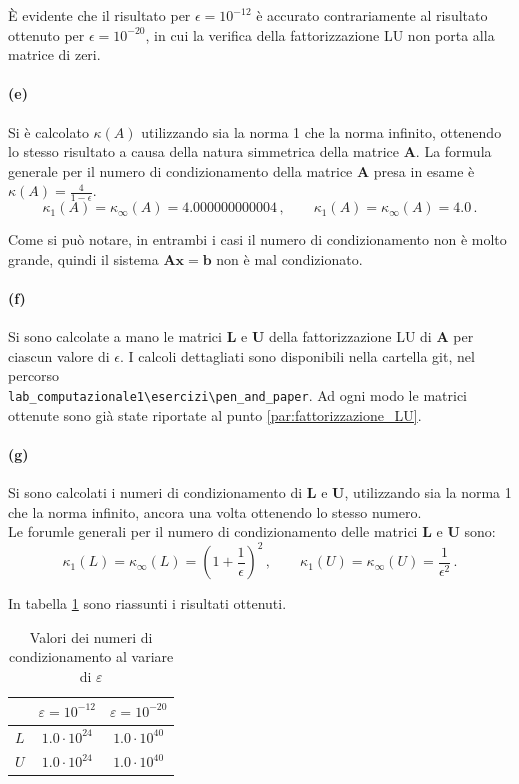 \documentclass[letterpaper, 12pt]{article}
\numberwithin{equation}{section}    %
\begin{document}
È evidente che il risultato per $\epsilon = 10^{-12}$ è accurato contrariamente al risultato ottenuto per
$\epsilon = 10^{-20}$, in cui la verifica della fattorizzazione LU non porta alla matrice di zeri.
\paragraph{(e)}Si è calcolato $\kappa(A)$ utilizzando sia la norma 1 che la norma infinito, ottenendo lo stesso
risultato a causa della natura simmetrica della matrice $\mathbf{A}$. La formula generale per il numero di
condizionamento della matrice $\mathbf{A}$ presa in esame è $ \kappa(A) = \frac{4}{1 - \epsilon}$.
\begin{equation*}
    \kappa_1(A) = \kappa_\infty(A) =  4.000000000004\,,
    \qquad
    \kappa_1(A) = \kappa_\infty(A) =  4.0\,.
\end{equation*}

Come si può notare, in entrambi i casi il numero di condizionamento non è molto grande, quindi il sistema
$\mathbf{Ax} = \mathbf{b}$ non è mal condizionato. 
\paragraph{(f)}Si sono calcolate a mano le matrici $\mathbf{L}$ e $\mathbf{U}$ della fattorizzazione LU di
$\mathbf{A}$ per ciascun valore di $\epsilon$. I calcoli dettagliati sono disponibili nella cartella git,
nel percorso \\ \verb|lab_computazionale1\esercizi\pen_and_paper|. Ad ogni modo le
matrici ottenute sono già state riportate al punto \ref{par:fattorizzazione_LU}. 
\paragraph{(g)}Si sono calcolati i numeri di condizionamento di $\mathbf{L}$ e $\mathbf{U}$, utilizzando sia 
la norma 1 che la norma infinito, ancora una volta ottenendo lo stesso numero. \\
Le forumle generali per il numero di condizionamento delle matrici $\mathbf{L}$ e $\mathbf{U}$ sono:
\begin{equation*}
    \kappa_1(L) = \kappa_\infty(L) = \left(1 + \frac{1}{\epsilon}\right)^2\,,
    \qquad
    \kappa_1(U) = \kappa_\infty(U) = \frac{1}{\epsilon^2}\,.
\end{equation*}

In tabella \ref{tab:LU_epsilon} sono riassunti i risultati ottenuti.

\begin{table}[!ht]
\centering
\caption{Valori dei numeri di condizionamento al variare di \( \varepsilon \)}
\label{tab:LU_epsilon}
\begin{tabular}{|c|c|c|}
\hline
 & \( \varepsilon = 10^{-12} \) & \( \varepsilon = 10^{-20} \) \\
\hline
\( L \) & $1.0 \cdot 10^{24}$ & $1.0 \cdot 10^{40}$ \\
\( U \) & $1.0 \cdot 10^{24}$ & $1.0 \cdot 10^{40}$ \\
\hline
\end{tabular}
\end{table}
\end{document}
